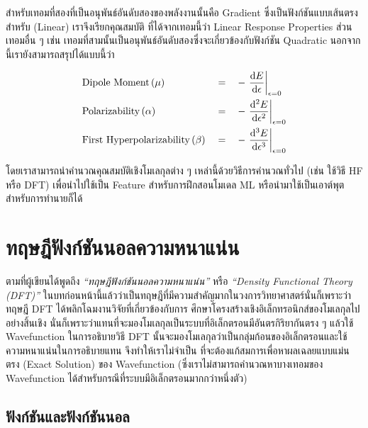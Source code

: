 \noindent สำหรับเทอมที่สองที่เป็นอนุพันธ์อันดับสองของพลังงานนั้นคือ Gradient ซึ่งเป็นฟังก์ชันแบบเส้นตรงสำหรับ (Linear) เราจึงเรียกคุณสมบัติ%
ที่ได้จากเทอมนี้ว่า Linear Response Properties ส่วนเทอมอื่น ๆ เช่น เทอมที่สามนั้นเป็นอนุพันธ์อันดับสองซึ่งจะเกี่ยวข้องกับฟังก์ชัน Quadratic  
นอกจากนี้เรายังสามารถสรุปได้แบบนี้ว่า

\begin{framed}
    \begin{align*}
        &\text{Dipole Moment}\,(\mu) &&= &&-\evaluated{\dv{E}{\epsilon}}_{\epsilon = 0} \\
        &\text{Polarizability}\,(\alpha) &&= &&-\evaluated{\dv[2]{E}{\epsilon}}_{\epsilon = 0} \\
        &\text{First Hyperpolarizability}\,(\beta) &&= &&-\evaluated{\dv[3]{E}{\epsilon}}_{\epsilon = 0}
    \end{align*}
\end{framed}

โดยเราสามารถนำคำนวณคุณสมบัติเชิงโมเลกุลต่าง ๆ เหล่านี้ด้วยวิธีการคำนวณทั่วไป (เช่น ใช้วิธี HF หรือ DFT) เพื่อนำไปใช้เป็น Feature 
สำหรับการฝึกสอนโมเดล ML หรือนำมาใช้เป็นเอาต์พุตสำหรับการทำนายก็ได้

\section{ทฤษฎีฟังก์ชันนอลความหนาแน่น}
\label{sec:dft}

ตามที่ผู้เขียนได้พูดถึง \textit{\enquote{ทฤษฎีฟังก์ชันนอลความหนาแน่น}} หรือ \textit{\enquote{Density Functional Theory 
(DFT)}} ในบทก่อนหน้านี้แล้วว่าเป็นทฤษฎีที่มีความสำคัญมากในวงการวิทยาศาสตร์นั่นก็เพราะว่าทฤษฎี DFT ได้พลิกโฉมงานวิจัยที่เกี่ยวข้องกับการ%
ศึกษาโครงสร้างเชิงอิเล็กทรอนิกส์ของโมเลกุลไปอย่างสิ้นเชิง นั่นก็เพราะว่าแทนที่จะมองโมเลกุลเป็นระบบที่อิเล็กตรอนมีอันตรกิริยากันตรง ๆ แล้วใช้ 
Wavefunction ในการอธิบายวิธี DFT นั้นจะมองโมเลกุลว่าเป็นกลุ่มก้อนของอิเล็กตรอนและใช้ความหนาแน่นในการอธิบายแทน จึงทำให้เราไม่จำเป็น%
ที่จะต้องแก้สมการเพื่อหาผลเฉลยแบบแม่นตรง (Exact Solution) ของ Wavefunction (ซึ่งเราไม่สามารถคำนวณหาบางเทอมของ Wavefunction 
ได้สำหรับกรณีที่ระบบมีอิเล็กตรอนมากกว่าหนึ่งตัว)

\subsection{ฟังก์ชันและฟังก์ชันนอล}
\label{ssec:function_functional}

